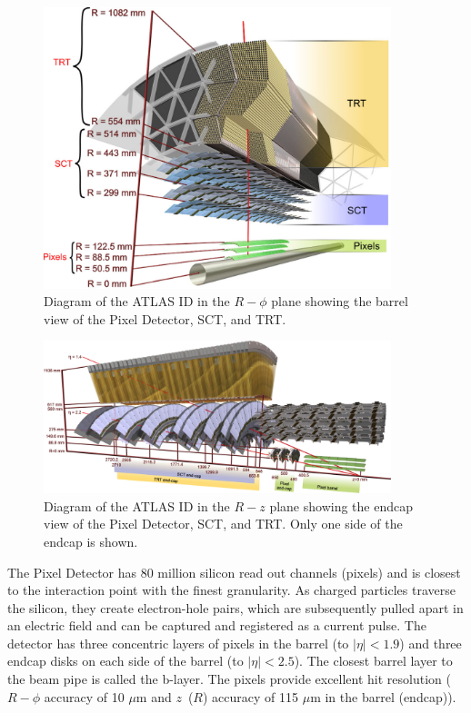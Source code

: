 \begin{figure}[!t]
\centering 
\includegraphics[width=0.9\textwidth]{figs/lhc/IDBarrel-eps-converted-to}
\caption{ Diagram of the ATLAS ID in the $R-\phi$ plane showing the barrel view of the Pixel Detector, SCT, and TRT.
}
\label{figure:lhc_id_barrel}
\end{figure}

\begin{figure}[!t]
\centering 
\includegraphics[width=0.9\textwidth]{figs/lhc/IDEndcap-eps-converted-to}
\caption{ Diagram of the ATLAS ID in the $R-z$ plane showing the endcap view of the Pixel Detector, SCT, and TRT. Only one side of the endcap is shown. 
}
\label{figure:lhc_id_endcap}
\end{figure}

The Pixel Detector has 80 million silicon read out channels (pixels) and is closest to the interaction point with the finest granularity. As charged particles traverse the silicon, they create electron-hole pairs, which are subsequently pulled apart in an electric field and can be captured and registered as a current pulse. The detector has three concentric layers of pixels in the barrel (to $|\eta| < 1.9$) and three endcap disks on each side of the barrel (to $|\eta| < 2.5$). The closest barrel layer to the beam pipe is called the b-layer. The pixels provide excellent hit resolution ($R-\phi$ accuracy of 10 $\mu$m and $z$\ ($R$) accuracy of 115 $\mu$m in the barrel (endcap)).

